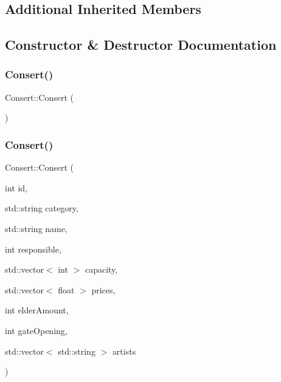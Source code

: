 \subsection*{Additional Inherited Members}


\subsection{Constructor \& Destructor Documentation}
\mbox{\label{class_consert_abb96ae345b4df98d518826145946f2fb}} 
\subsubsection{\texorpdfstring{Consert()}{Consert()}\hspace{0.1cm}{\footnotesize\ttfamily [1/2]}}
{\footnotesize\ttfamily Consert\+::\+Consert (\begin{DoxyParamCaption}{ }\end{DoxyParamCaption})}

\mbox{\label{class_consert_a0e97c64e34ba29760ee32dc6dae5fb0e}} 
\subsubsection{\texorpdfstring{Consert()}{Consert()}\hspace{0.1cm}{\footnotesize\ttfamily [2/2]}}
{\footnotesize\ttfamily Consert\+::\+Consert (\begin{DoxyParamCaption}\item[{int}]{id,  }\item[{std\+::string}]{category,  }\item[{std\+::string}]{name,  }\item[{int}]{responsible,  }\item[{std\+::vector$<$ int $>$}]{capacity,  }\item[{std\+::vector$<$ float $>$}]{prices,  }\item[{int}]{elder\+Amount,  }\item[{int}]{gate\+Opening,  }\item[{std\+::vector$<$ std\+::string $>$}]{artists }\end{DoxyParamCaption})}



